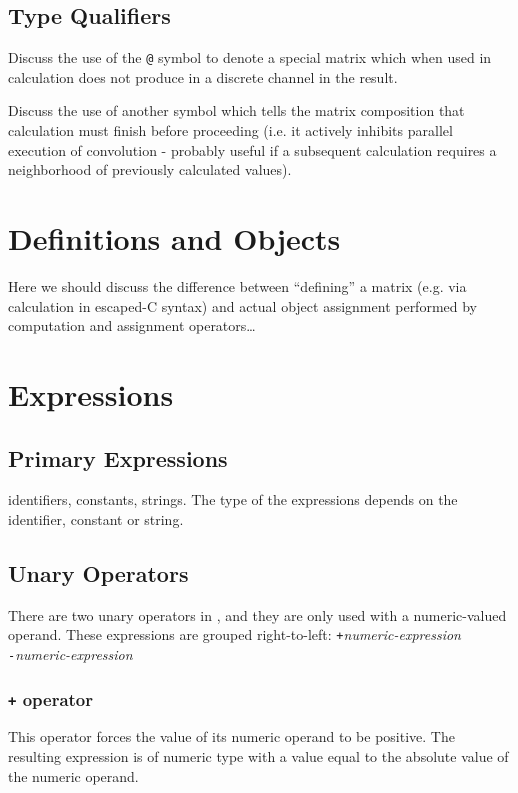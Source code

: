 \subsection{Type Qualifiers}
\label{ssec:typequal}
Discuss the use of the \texttt{@} symbol to denote a special matrix which when used
in calculation does not produce in a discrete channel in the result.

Discuss the use of another symbol which tells the matrix composition that calculation must finish before proceeding (i.e. it actively inhibits parallel execution of convolution - probably useful if a subsequent calculation requires a neighborhood of previously calculated values).

\section{Definitions and Objects}
\label{sec:defobj}
Here we should discuss the difference between ``defining'' a matrix (e.g. via calculation in escaped-C syntax) and actual object assignment performed by computation and assignment operators\ldots

\section{Expressions}
\label{sec:expressions}

\subsection{Primary Expressions}
\label{ssec:primaryexpresions}
identifiers, constants, strings. The type of the expressions depends on the identifier, constant or string.

\subsection{Unary Operators}
\label{ssec:unaryoperators}
There are two unary operators in \sys{}, and they are only used with a
numeric-valued operand.
These expressions are grouped right-to-left:
\startsyn
\texttt{+}\emph{numeric-expression} \\
\texttt{-}\emph{numeric-expression}
\stopsyn

\subsubsection{\texttt{+} operator}
This operator forces the value of its numeric operand to be positive.
The resulting expression is of numeric type with a value equal to the
absolute value of the numeric operand.

